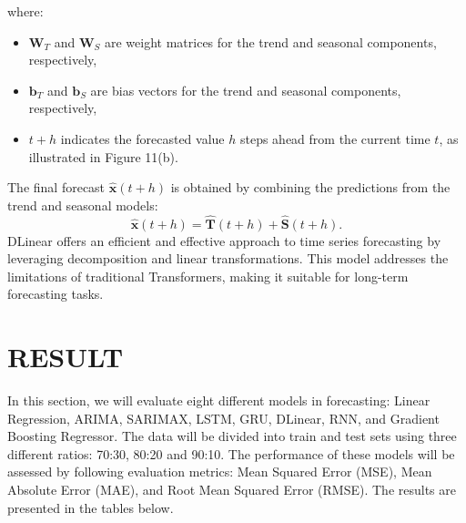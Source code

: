 \documentclass{ieeeojies}
\begin{document}
where:
\begin{itemize}
    \item $\mathbf{W}_T$ and $\mathbf{W}_S$ are weight matrices for the trend and seasonal components, respectively,
    \item $\mathbf{b}_T$ and $\mathbf{b}_S$ are bias vectors for the trend and seasonal components, respectively,
    \item $t+h$ indicates the forecasted value $h$ steps ahead from the current time $t$, as illustrated in Figure 11(b).
\end{itemize}

The final forecast \( \hat{\mathbf{x}}(t+h) \) is obtained by combining the predictions from the trend and seasonal models:
\begin{equation}
    \hat{\mathbf{x}}(t+h) = \hat{\mathbf{T}}(t+h) + \hat{\mathbf{S}}(t+h).
\end{equation}
DLinear offers an efficient and effective approach to time series forecasting by leveraging decomposition and linear transformations. This model addresses the limitations of traditional Transformers, making it suitable for long-term forecasting tasks.
\section{RESULT}
In this section, we will evaluate eight different models in forecasting: Linear Regression, ARIMA, SARIMAX, LSTM, GRU, DLinear, RNN, and Gradient Boosting Regressor. The data will be divided into train and test sets using three different ratios: 70:30, 80:20 and 90:10. The performance of these models will be assessed by following evaluation metrics: Mean Squared Error (MSE), Mean Absolute Error (MAE), and Root Mean Squared Error (RMSE). The results are presented in the tables below.
\end{document}
